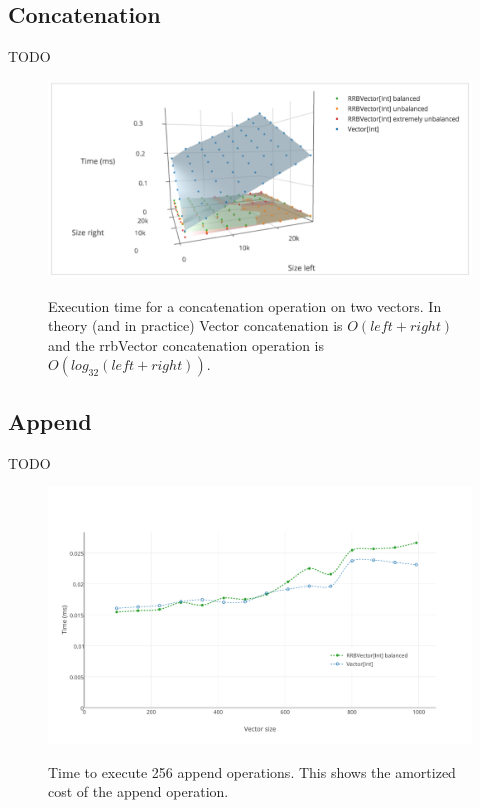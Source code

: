 \subsection{Concatenation}
\color{red} TODO \color{black}

\begin{figure}[h!]
  \centering
  \includegraphics[width=\textwidth]{Benchmarks/Concat.png}
  \label{ConcatBenchmarks}
  \caption{Execution time for a concatenation operation on two vectors. In theory (and in practice) Vector concatenation is $O(left + right)$ and the rrbVector concatenation operation is $O(log_{32}(left + right))$.}
\end{figure}

\subsection{Append}

\color{red} TODO \color{black}

\begin{figure}[h!]
  \centering
  \includegraphics[width=\textwidth]{Benchmarks/Append_2.pdf}
  \label{Append2Benchmarks}
  \caption{Time to execute 256 append operations. This shows the amortized cost of the append operation.}
\end{figure}

